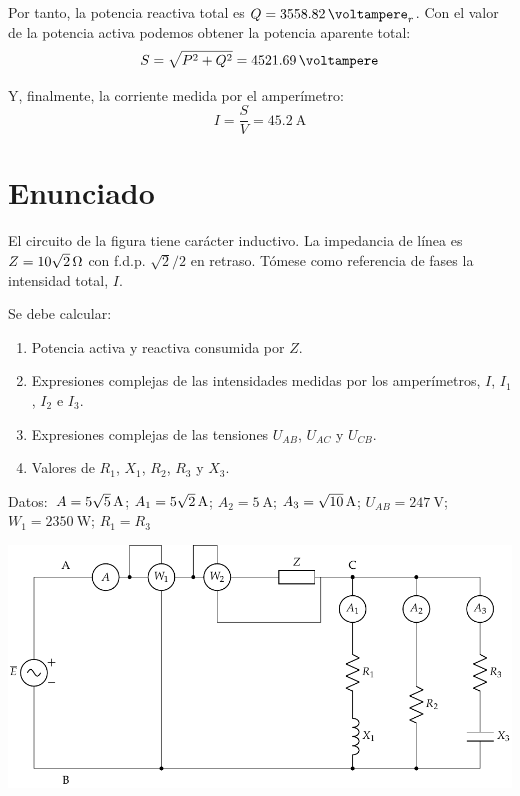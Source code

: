 Por tanto, la potencia reactiva total es $Q = \qty{3558.82}{\voltampere}_r$. Con el valor de la potencia activa podemos obtener la potencia aparente total:
\begin{equation*}
  S = \sqrt{P^2 + Q^2} = \qty{4521.69}{\voltampere}
\end{equation*}

Y, finalmente, la corriente medida por el amperímetro:
\begin{equation*}
  I = \frac{S}{V} = \qty{45.2}{\ampere}
\end{equation*}


\section{Enunciado}
El circuito de la figura tiene carácter inductivo.  La impedancia de
línea es $Z=\qty[parse-numbers=false]{10\sqrt{2}}{\ohm}$ con
f.d.p. $\sqrt{2}/2$ en retraso. Tómese como referencia de fases la
intensidad total, $I$.

\vspace{3mm}
Se debe calcular:
\begin{enumerate}

\item Potencia activa y reactiva consumida por $Z$.

\item Expresiones complejas de las intensidades medidas por los
  amperímetros, $I$, $I_1$, $I_2$ e $I_3$. 

\item Expresiones complejas de las tensiones $U_{AB}$, $U_{AC}$ y
  $U_{CB}$.

\item Valores de $R_1$, $X_1$, $R_2$, $R_3$ y $X_3$.

\end{enumerate}

Datos: $\;A = \qty[parse-numbers = false]{5\sqrt{5}}{\ampere}$;\; $A_1 = \qty[parse-numbers = false]{5\sqrt{2}}{\ampere}$;\; $A_2 = \qty{5}{\ampere}$;\;  $A_3 = \qty[parse-numbers = false]{\sqrt{10}}{\ampere}$;\;  $U_{AB} = \qty{247}{\volt}$;\;  $W_1 = \qty{2350}{\watt}$;\;
$R_1 = R_3$

\begin{center}
  \includegraphics[width=0.8\linewidth]{figuras/BT2_17.pdf}
\end{center}


